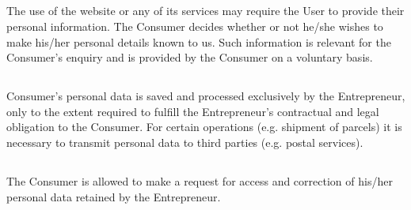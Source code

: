 
			\subsection{} The use of the website or any of its services may require the User to provide their personal information. The Consumer decides whether or not he/she wishes to make his/her personal details known to us. Such information is relevant for the Consumer’s enquiry and is provided by the Consumer on a voluntary basis. 

			\subsection{} Consumer’s personal data is saved and processed exclusively by the Entrepreneur,  only to the extent required to fulfill the Entrepreneur’s contractual and legal obligation to the Consumer. For certain operations (e.g. shipment of parcels) it is necessary to transmit personal data to third parties (e.g. postal services).
			
			\subsection{} The Consumer is allowed to make a request for access and correction of his/her personal data retained by the Entrepreneur. 
